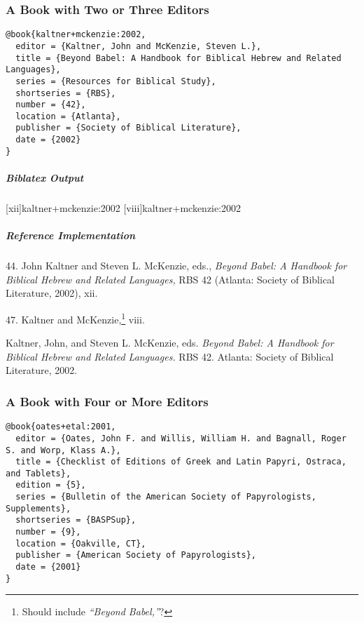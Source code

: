 \documentclass[a4paper]{article}
\newenvironment{biboutput}{%
  \subparagraph{Biblatex Output}
}{\color{black}}
\newenvironment{refimp}{%
  \subparagraph{Reference Implementation}
  \color{reference-colour}
  \rm
}{\par\color{black}}
\begin{document}
\subsubsection{A Book with Two or Three Editors}

\begin{lstlisting}
@book{kaltner+mckenzie:2002,
  editor = {Kaltner, John and McKenzie, Steven L.},
  title = {Beyond Babel: A Handbook for Biblical Hebrew and Related Languages},
  series = {Resources for Biblical Study},
  shortseries = {RBS},
  number = {42},
  location = {Atlanta},
  publisher = {Society of Biblical Literature},
  date = {2002}
}
\end{lstlisting}  

\begin{biboutput}
  [xii]{kaltner+mckenzie:2002}
  [viii]{kaltner+mckenzie:2002}
\end{biboutput}

\begin{refimp}
  44. John Kaltner and Steven L. McKenzie, eds., \emph{Beyond Babel: A Handbook
  for Biblical Hebrew and Related Languages,} RBS 42 (Atlanta: Society of
  Biblical Literature, 2002), xii.

  47. Kaltner and McKenzie,\footnote{Should include \emph{“Beyond Babel,”}?} viii.

  \hangindent\bibindent Kaltner, John, and Steven L. McKenzie, eds.
  \emph{Beyond Babel: A Handbook for Biblical Hebrew and Related Languages.}
  RBS 42. Atlanta: Society of Biblical Literature, 2002.

\end{refimp}

\subsubsection{A Book with Four or More Editors}

\begin{lstlisting}
@book{oates+etal:2001,
  editor = {Oates, John F. and Willis, William H. and Bagnall, Roger S. and Worp, Klass A.},
  title = {Checklist of Editions of Greek and Latin Papyri, Ostraca, and Tablets},
  edition = {5},
  series = {Bulletin of the American Society of Papyrologists, Supplements},
  shortseries = {BASPSup},
  number = {9},
  location = {Oakville, CT},
  publisher = {American Society of Papyrologists},
  date = {2001}
}
\end{lstlisting}  
\end{document}
